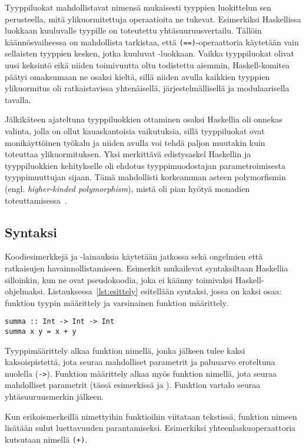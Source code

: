 \documentclass[finnish]{tktltiki2}
\begin{document}
Tyyppiluokat mahdollistavat nimensä mukaisesti tyyppien luokittelun sen perusteella, mitä
ylikuormitettuja operaatioita ne tukevat. Esimerkiksi Haskellissa luokkaan  kuuluvalle
tyypille on toteutettu yhtäsuuruusvertailu. Tällöin käännösvaiheessa on mahdollista tarkistaa, että
\verb|(==)|-operaattoria käytetään vain sellaisten tyyppien kesken, jotka kuuluvat
-luokkaan. Vaikka tyyppiluokat olivat uusi keksintö eikä niiden toimivuutta oltu todistettu
aiemmin, Haskell-komitea päätyi omaksumaan ne osaksi kieltä, sillä niiden avulla kaikkien tyyppien
ylikuormitus oli ratkaistavissa yhtenäisellä, järjestelmällisellä ja modulaarisella tavalla.

Jälkikäteen ajateltuna tyyppiluokkien ottaminen osaksi Haskellia oli onnekas valinta, jolla on ollut
kauaskantoisia vaikutuksia, sillä tyyppiluokat ovat monikäyttöinen työkalu ja niiden avulla voi
tehdä paljon muutakin kuin toteuttaa ylikuormituksen. Yksi merkittävä edistysaskel Haskellin ja
tyyppiluokkien kehitykselle oli ehdotus tyyppimuodostajan parametroimisesta tyyppimuuttujan sijaan.
Tämä mahdollisti korkeamman asteen polymorfismin (engl. \emph{higher-kinded polymorphism}), mistä
oli pian hyötyä monadien toteuttamisessa~\cite{hoh07}.

\subsection{Syntaksi}

Koodiesimerkkejä ja -lainauksia käytetään jatkossa sekä ongelmien että ratkaisujen
havainnollistamiseen. Esimerkit mukailevat syntaksiltaan Haskellia silloinkin, kun ne ovat
pseudokoodia, joka ei käänny toimivaksi Haskell-ohjelmaksi. Listauksessa~\ref{lst:esittely}
esitellään syntaksi, jossa on kaksi osaa: funktion tyypin määrittely ja varsinainen funktion
määrittely.

\begin{lstlisting}[float,label={lst:esittely},caption={Syntaksin esittely}]
summa :: Int -> Int -> Int
summa x y = x + y
\end{lstlisting}

Tyyppimäärittely alkaa funktion nimellä, jonka jälkeen tulee kaksi kaksoispistettä, jota seuraa
mahdolliset parametrit ja paluuarvo eroteltuna nuolella (\verb|->|). Funktion määrittely alkaa myös
funktion nimellä, jota seuraa mahdolliset parametrit (tässä esimerkissä  ja ).
Funktion vartalo seuraa yhtäsuuruusmerkin jälkeen.

Kun erikoismerkeillä nimettyihin funktioihin viitataan tekstissä, funktion nimeen lisätään sulut
luettavuuden parantamiseksi. Esimerkiksi yhteenlaskuoperaattoria kutsutaan nimellä \verb|(+)|.
\end{document}
